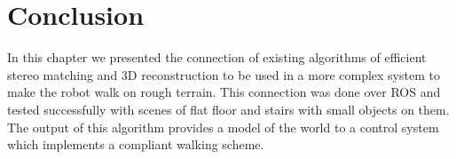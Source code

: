 
\section{Conclusion}

In this chapter we presented the connection of existing algorithms of efficient stereo matching and 3D reconstruction to be used in a more complex system to make the robot walk on rough terrain. This connection was done over ROS and tested successfully with scenes of flat floor and stairs with small objects on them. The output of this algorithm provides a model of the world to a control system which implements a compliant walking scheme.